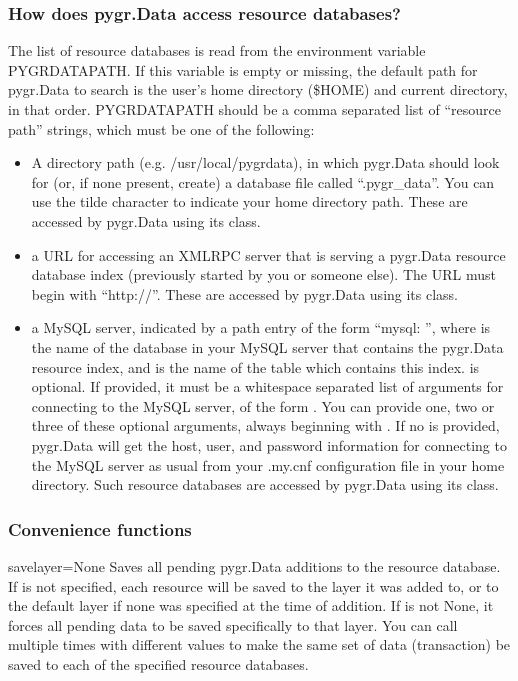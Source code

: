 \documentclass{howto}
\begin{document}
\subsubsection{How does pygr.Data access resource databases?}
The list of resource databases is read from the environment variable
PYGRDATAPATH.  If this variable is empty or missing, the default path
for pygr.Data to search is the user's home directory (\$HOME) and
current directory, in that order.  PYGRDATAPATH should be a comma separated list
of ``resource path'' strings, which must be one of the following:
\begin{itemize}
\item A directory path (e.g. /usr/local/pygrdata), in which pygr.Data should
look for (or, if none present, create) a database file called ``.pygr_data''.  
You can use the tilde character to indicate your home directory path.
These are accessed by pygr.Data using its  class.

\item a URL for accessing an XMLRPC server that is serving a pygr.Data
resource database index (previously started by you or someone else).
The URL must begin with ``http://''.
These are accessed by pygr.Data using its  class.

\item a MySQL server, indicated by a path entry of the form 
``mysql: '',
where  is the name of the database in your MySQL
server that contains the pygr.Data resource index,
and  is the name of the table which contains this index.
 is optional.  If provided, it must be a whitespace separated 
list of arguments for connecting to the MySQL server, of the form
  .  You can provide one, two
or three of these optional arguments, always beginning with .  
If no  is provided,
pygr.Data will get the host, user, and password information for connecting 
to the MySQL server as usual from your
.my.cnf configuration file in your home directory.
Such resource databases are accessed by pygr.Data using its 
 class.
\end{itemize}

\subsubsection{Convenience functions}
\begin{funcdesc}{save}{layer=None}
  Saves all pending pygr.Data additions to the resource database.
  If  is not specified, each resource will be saved to the
  layer it was added to, or to the default layer if none was specified
  at the time of addition.  If  is not None, it forces all
  pending data to be saved specifically to that layer.  You can call
   multiple times with different 
  values to make the same set of data (transaction) be saved to each
  of the specified resource databases.
\end{funcdesc}
\end{document}
